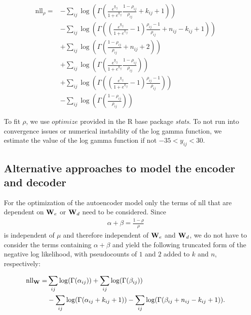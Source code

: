 \begin{align*}
\text{nll}_{\rho} =& 
     - \sum_{ij}\log\left(\Gamma\left(\frac{ e^{y_{ij}} }{ 1+e^{y_{ij}} }\frac{ 1-\rho_{ij} }{ \rho_{ij} } + k_{ij} + 1 \right) \right) \\ %
    &- \sum_{ij}\log\left(\Gamma\left(\left(\frac{ e^{y_{ij}} }{ 1+e^{y_{ij}} } - 1 \right) \frac{ \rho_{ij} - 1 }{ \rho_{ij} } + n_{ij} - k_{ij} + 1\right) \right) \\ %
    &+ \sum_{ij}\log\left(\Gamma\left(\frac{ 1 - \rho_{ij} }{ \rho_{ij} } + n_{ij} + 2\right) \right) \\ %
    &+ \sum_{ij}\log\left(\Gamma\left(\frac{ e^{y_{ij}} }{ 1+e^{y_{ij}} }\frac{ 1-\rho_{ij} }{ \rho_{ij} }\right) \right) \\ %
    &+ \sum_{ij}\log\left(\Gamma\left( \left (\frac{ e^{y_{ij}} }{ 1+e^{y_{ij}} } - 1 \right) \frac{ \rho_{ij} - 1 }{ \rho_{ij} }\right) \right) \\ %
    &- \sum_{ij}\log\left(\Gamma\left(\frac{ 1 - \rho_{ij} }{ \rho_{ij} } \right) \right) %
\end{align*}

To fit $\rho$, we use $optimize$ provided in the R base package \textit{stats}.
To not run into convergence issues or numerical instability of the log gamma function, 
we estimate the value of the log gamma function if not $-35 < y_{ij} < 30$.

\subsection{Alternative approaches to model the encoder and decoder}

For the optimization of the autoencoder model only the terms of $\text{nll}$
that are dependent on $\mathbf{W}_e$ or $\mathbf{W}_d$ need to be considered. 
Since
\begin{align*}
\alpha + \beta = \frac{1-\rho}{\rho}
\end{align*}
is independent of $\mu$ and therefore independent of $\mathbf{W}_e$ and $\mathbf{W}_d$,
we do not have to consider the terms containing $\alpha + \beta$ and yield the 
following truncated form of the negative log likelihood, with pseudocounts of 
$1$ and $2$ added to $k$ and $n$, respectively:

\begin{align} \label{eq:nll-w}
\text{nll}_{\mathbf{W}} =& \sum_{ij}\log(\Gamma(\alpha_{ij})) + \sum_{ij}\log(\Gamma(\beta_{ij})) \\
&- \sum_{ij}\log(\Gamma(\alpha_{ij}+k_{ij}+1)) - \sum_{ij}\log(\Gamma(\beta_{ij}+n_{ij}-k_{ij}+1)).
\end{align}

